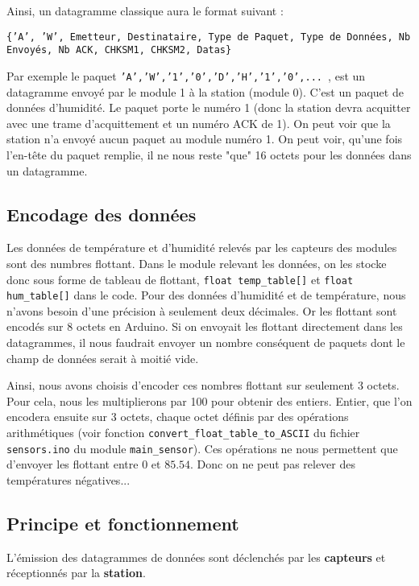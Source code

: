 \documentclass[a4paper]{article}
\begin{document}
Ainsi, un datagramme classique aura le format suivant : 
    \begin{center}
        \texttt{\{'A', 'W', Emetteur, Destinataire, Type de Paquet, Type de Données, Nb Envoyés, Nb ACK, CHKSM1, CHKSM2, Datas\}}
    \end{center}
Par exemple le paquet \texttt{'A','W','1','0','D','H','1','0',... }, est un datagramme envoyé 
par le module 1 à la station (module 0). C'est un paquet de données d'humidité. Le paquet porte le numéro 1 (donc la station
devra acquitter avec une trame d'acquittement et un numéro ACK de 1). On peut voir que la station n'a envoyé aucun paquet au 
module numéro 1. 
On peut voir, qu'une fois l'en-tête du paquet remplie, il ne nous reste "que" 16 octets pour les données dans un datagramme. 

\subsection{Encodage des données}

Les données de température et d'humidité relevés par les capteurs des modules sont des numbres flottant. 
Dans le module relevant les données, on les stocke donc sous forme de tableau de flottant, \texttt{float temp\_table[]}
et \texttt{float hum\_table[]} dans le code. 
Pour des données d'humidité et de température, nous n'avons besoin d'une précision à seulement deux décimales. 
Or les flottant sont encodés sur 8 octets en Arduino. Si on envoyait les flottant directement dans les datagrammes, 
il nous faudrait envoyer un nombre conséquent de paquets dont le champ de données serait à moitié vide. 

Ainsi, nous avons choisis d'encoder ces nombres flottant sur seulement 3 octets. Pour cela, nous les multiplierons 
par 100 pour obtenir des entiers. Entier, que l'on encodera ensuite sur 3 octets, chaque octet définis par des opérations 
arithmétiques (voir fonction \texttt{convert\_float\_table\_to\_ASCII} du fichier \texttt{sensors.ino} du module \texttt{main\_sensor}). 
Ces opérations ne nous permettent que d'envoyer les flottant entre $0$ et $85.54$. Donc on ne peut pas relever des températures 
négatives...

\subsection{Principe et fonctionnement}

L'émission des datagrammes de données sont déclenchés par les \textbf{capteurs} et réceptionnés par la \textbf{station}. 
\end{document}
